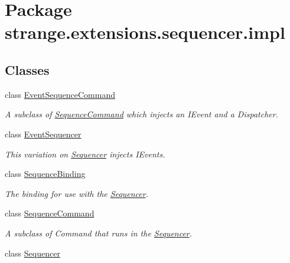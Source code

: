 \hypertarget{namespacestrange_1_1extensions_1_1sequencer_1_1impl}{\section{Package strange.\-extensions.\-sequencer.\-impl}
\label{namespacestrange_1_1extensions_1_1sequencer_1_1impl}
}
\subsection*{Classes}
\begin{DoxyCompactItemize}
\item 
class \hyperlink{classstrange_1_1extensions_1_1sequencer_1_1impl_1_1_event_sequence_command}{Event\-Sequence\-Command}
\begin{DoxyCompactList}\small\item\em A subclass of \hyperlink{classstrange_1_1extensions_1_1sequencer_1_1impl_1_1_sequence_command}{Sequence\-Command} which injects an I\-Event and a Dispatcher. \end{DoxyCompactList}\item 
class \hyperlink{classstrange_1_1extensions_1_1sequencer_1_1impl_1_1_event_sequencer}{Event\-Sequencer}
\begin{DoxyCompactList}\small\item\em This variation on \hyperlink{classstrange_1_1extensions_1_1sequencer_1_1impl_1_1_sequencer}{Sequencer} injects I\-Events. \end{DoxyCompactList}\item 
class \hyperlink{classstrange_1_1extensions_1_1sequencer_1_1impl_1_1_sequence_binding}{Sequence\-Binding}
\begin{DoxyCompactList}\small\item\em The binding for use with the \hyperlink{classstrange_1_1extensions_1_1sequencer_1_1impl_1_1_sequencer}{Sequencer}. \end{DoxyCompactList}\item 
class \hyperlink{classstrange_1_1extensions_1_1sequencer_1_1impl_1_1_sequence_command}{Sequence\-Command}
\begin{DoxyCompactList}\small\item\em A subclass of Command that runs in the \hyperlink{classstrange_1_1extensions_1_1sequencer_1_1impl_1_1_sequencer}{Sequencer}. \end{DoxyCompactList}\item 
class \hyperlink{classstrange_1_1extensions_1_1sequencer_1_1impl_1_1_sequencer}{Sequencer}

\end{DoxyCompactItemize}
